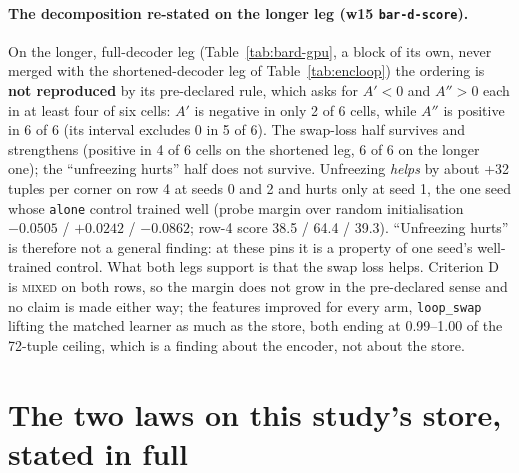 \documentclass{article} %
\begin{document}
\paragraph{The decomposition re-stated on the longer leg (w15 \texttt{bar-d-score}).} On the
longer, full-decoder leg (Table~\ref{tab:bard-gpu}, a block of its own, never merged with the
shortened-decoder leg of Table~\ref{tab:encloop}) the ordering is \textbf{not reproduced} by its
pre-declared rule, which asks for $A'<0$ and $A''>0$ each in at least four of six cells: $A'$ is
negative in only 2 of 6 cells, while $A''$ is positive in 6 of 6 (its interval excludes 0 in 5 of %
6). The swap-loss half survives and strengthens (positive in 4 of 6 cells on the shortened leg, 6 %
of 6 on the longer one); the ``unfreezing hurts'' half does not survive. Unfreezing \emph{helps} by
about +32 tuples per corner on row 4 at seeds 0 and 2 and hurts only at seed 1, the one seed whose %
\texttt{alone} control trained well (probe margin over random initialisation $-0.0505$ / %
$+0.0242$ / $-0.0862$; row-4 score 38.5 / 64.4 / 39.3). ``Unfreezing hurts'' is therefore not a %
general finding: at these pins it is a property of one seed's well-trained control. What both legs
support is that the swap loss helps. Criterion D is \textsc{mixed} on both rows, so the margin
does not grow in the pre-declared sense and no claim is made either way; the features improved
for every arm, \texttt{loop\_swap} lifting the matched learner as much as the store, both ending at
0.99--1.00 of the 72-tuple ceiling, which is a finding about the encoder, not about the store. %

\section{The two laws on this study's store, stated in full}
\label{app:laws}
\end{document}
